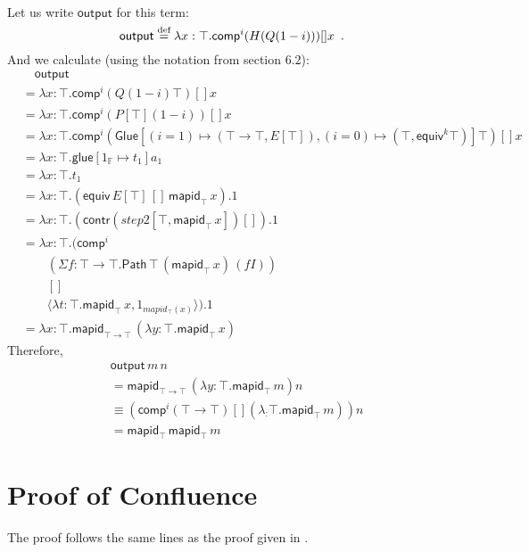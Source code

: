 \documentclass[a4paper,UKenglish]{lipics-v2016}
\newcommand*{\eqdef}{\mathrel{\smash{\stackrel{\text{def}}{=}}}}
\newcommand{\Path}[3]{\ensuremath{\mathsf{Path} \, {#1} \, {#2} \, {#3}}}
\newcommand{\outputt}{\mathsf{output}}
\newcommand{\mapid}[2]{\mathsf{mapid}_{#1} \, {#2}}
\newcommand{\comp}{\mathsf{comp}}
\theoremstyle{plain}
\theoremstyle{definition}
\begin{document}
Let us write $\outputt$ for this term:
$$ \outputt \eqdef \lambda x : \top. \comp^i (H (Q (1 - i))) [] x \enspace . $$
And we calculate (using the notation from \cite{cchm:cubical} section 6.2):
\begin{align*}
& \quad \outputt \\
& = \lambda x : \top. \comp^i (Q (1 - i) \top) [] x \\
& = \lambda x : \top. \comp^i (P[\top] (1 - i)) [] x \\
& = \lambda x : \top. \comp^i (\mathsf{Glue}[(i = 1) \mapsto (\top \rightarrow \top, E[\top]), (i = 0) \mapsto (\top, \mathsf{equiv}^k \top)] \top) [] x \\
& = \lambda x : \top. \mathsf{glue} [ 1_\mathbb{F} \mapsto t_1 ] a_1 \\
& = \lambda x : \top. t_1 \\
& = \lambda x : \top. (\mathsf{equiv} \, E[\top] \, [] \, \mapid{\top}{x}).1 \\
& = \lambda x : \top. (\mathsf{contr} (step2[\top, \mapid{\top}{x}]) []).1 \\
& = \lambda x : \top. (\comp^i \\
& \qquad (\Sigma f : \top \rightarrow \top. \Path{\top}{(\mapid{\top}{x})}{(fI)}) \\
& \qquad [] \\
& \qquad \langle \lambda t : \top. \mapid{\top}{x}, 1_{mapid_\top(x)} \rangle).1 \\
& = \lambda x : \top. \mapid{\top \rightarrow \top}{(\lambda y : \top. \mapid{\top}{x})}
\end{align*}
Therefore,
\begin{align*}
& \outputt \, m \, n \\
& = \mapid{\top \rightarrow \top}{(\lambda y : \top. \mapid{\top}{m})} n \\
& \equiv (\comp^i (\top \rightarrow \top) [] (\lambda _ : \top. \mapid{\top}{m})) n \\
& = \mapid{\top}{\mapid{\top}{m}}
\end{align*}

\section{Proof of Confluence}
\label{section:confluence}

The proof follows the same lines as the proof given in \cite{luo:car}.
\end{document}
